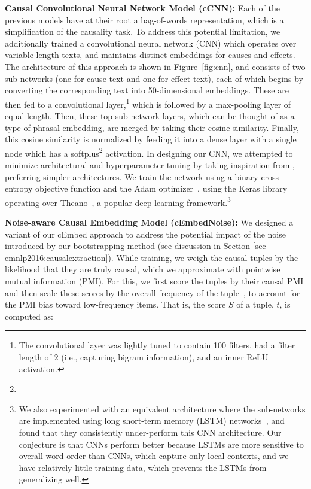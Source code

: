 {\flushleft \textbf{Causal Convolutional Neural Network Model (cCNN):}}
Each of the previous models have at their root a bag-of-words representation, which is a simplification of the causality task. To address this potential limitation, we additionally trained a convolutional neural network (CNN) which operates over variable-length texts, and maintains distinct embeddings for causes and effects.  The architecture of this approach is shown in Figure~\ref{fig:cnn}, and consists of two sub-networks (one for cause text and one for effect text), each of which begins by converting the corresponding text into 50-dimensional embeddings.  These are then fed to a convolutional layer,\footnote{The convolutional layer was lightly tuned to contain 100 filters, had a filter length of 2 (i.e., capturing bigram information), and an inner ReLU activation.} which is followed by a max-pooling layer of equal length.
Then, these top sub-network layers, which can be thought of as a type of phrasal embedding, are merged by taking their cosine similarity.  Finally, this cosine similarity is normalized by feeding it into a dense layer with a single node which has a softplus\footnote{} activation.  
In designing our CNN, we attempted to minimize architectural and hyperparameter tuning by taking inspiration from \citet{iyyer2015deep}, preferring simpler architectures.
We train the network using a binary cross entropy objective function and the Adam optimizer~\citep{kingma2014adam}, using the Keras library~\citep{chollet2015keras} operating over Theano~\citep{2016arXiv160502688short}, a popular deep-learning framework.\footnote{We also experimented with an equivalent architecture where the sub-networks are implemented using long short-term memory (LSTM) networks~\citep{hochreiter1997long}, and found that they consistently under-perform this CNN architecture. Our conjecture is that CNNs perform better because LSTMs are more sensitive to overall word order than CNNs, which capture only local contexts, and we have relatively little training data, which prevents the LSTMs from generalizing well.}

{\flushleft \textbf{Noise-aware Causal Embedding Model (cEmbedNoise):}} 
We designed a variant of our cEmbed approach to address the potential impact of the noise introduced by our bootstrapping method (see discussion in Section \ref{sec-emnlp2016:causalextraction}).
While training, we weigh the causal tuples by the likelihood that they are truly causal, which we approximate with pointwise mutual information (PMI).
For this, we first score the tuples by their causal PMI and then scale these scores by the overall frequency of the tuple~\citep{riloff1996automatically}, to account for the PMI bias toward low-frequency items.  That is, the score $S$ of a tuple, $t$, is computed as: 

